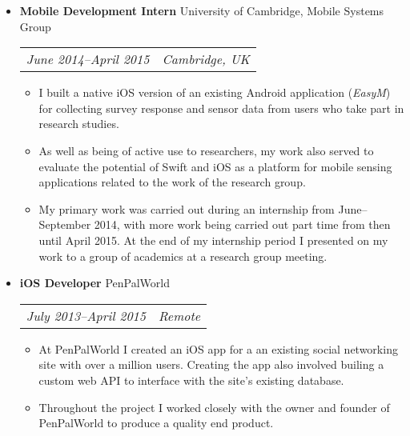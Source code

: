 \documentclass[letterpaper]{article}
\begin{document}
\begin{itemize}
    
    \item \textbf{Mobile Development Intern} University of Cambridge, Mobile Systems Group \\
		\begin{tabular}{c|c}
            \emph{June 2014--April 2015} & \emph{Cambridge, UK}
		\end{tabular}
		\begin{itemize}

            \item I built a native iOS version of an existing Android
                application (\emph{EasyM}) for collecting survey response and
                sensor data from users who take part in research studies.

            \item As well as being of active use to researchers, my work also
                served to evaluate the potential of Swift and iOS as a platform
                for mobile sensing applications related to the work of the
                research group.

            \item My primary work was carried out during an internship from
                June--September 2014, with more work being carried out part time
                from then until April 2015. At the end of my internship period I
                presented on my work to a group of academics at a research group
                meeting.

		\end{itemize}
	
    \item \textbf{iOS Developer} PenPalWorld \\
		\begin{tabular}{c|c}
			\emph{July 2013--April 2015} & \emph{Remote}
		\end{tabular}
		\begin{itemize}

            \item At PenPalWorld I created an iOS app for a an existing social
                networking site with over a million users. Creating the app also
                involved builing a custom web API to interface with the site's
                existing database.

            \item Throughout the project I worked closely with the owner
                and founder of PenPalWorld to produce a quality end product.


\end{itemize}
\end{itemize}
\end{document}
